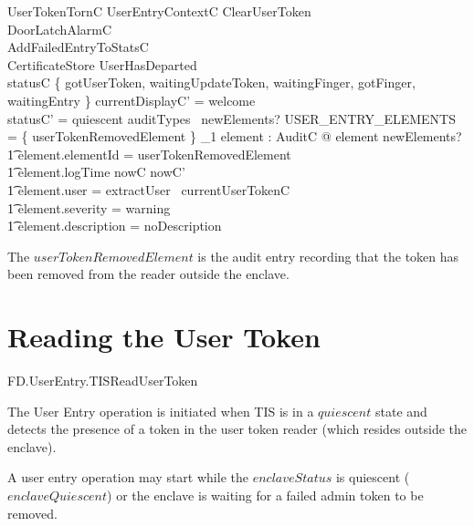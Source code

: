 \begin{schema}{UserTokenTornC}
        UserEntryContextC
\also
	ClearUserToken
\\      \Xi DoorLatchAlarmC
\\      AddFailedEntryToStatsC      
\\      \Xi CertificateStore
\where
        UserHasDeparted
\\      statusC \in \{ gotUserToken, waitingUpdateToken,
waitingFinger, gotFinger, waitingEntry \}
\also
        currentDisplayC' = welcome
\\      statusC' = quiescent 
\also
        auditTypes~ newElements? \cap USER\_ENTRY\_ELEMENTS = 
        \{ userTokenRemovedElement \} 
\also
        \exists_1 element : AuditC @ element \in newElements? 
\\ \t1  \land element.elementId = userTokenRemovedElement
\\ \t1  \land element.logTime \in nowC \upto nowC'
\\ \t1  \land element.user = extractUser~ currentUserTokenC
\\ \t1  \land element.severity = warning
\\ \t1  \land element.description = noDescription

\end{schema}
\begin{Zcomment}
\item
The $userTokenRemovedElement$ is the audit entry recording that the
token has been removed from the reader outside the enclave. 
\end{Zcomment}

\section{Reading the User Token}
\begin{traceunit}{FD.UserEntry.TISReadUserToken}
\end{traceunit}


The User Entry operation is initiated when TIS is in a $quiescent$ state
and detects the presence of
a token in the user token reader (which resides outside the enclave). 

A user entry operation may start while the $enclaveStatus$ is
quiescent ($enclaveQuiescent$) or the enclave is waiting for a failed
admin token to be removed.

